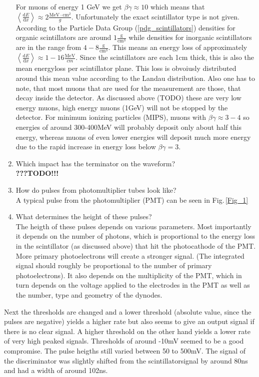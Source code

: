 \begin{enumerate}
For muons of energy 1 GeV we get $\beta\gamma\approx10$ which means that $\left\langle \frac{\mathrm{d}E}{\mathrm{d}x}\right\rangle \approx 2 \frac{\text{MeV}\cdot\text{cm}^2}{g}$. Unfortunately the exact scintillator type is not given. According to the Particle Data Group (\ref{pdg_scintillators}) densities for organic scintillators are around $1 \frac{\text{g}}{\text{cm}^3}	$ while densities for inorganic scintillators are in the range from $4-8 \frac{\text{g}}{\text{cm}^3}$. This means an energy loss of approximately $\left\langle \frac{\mathrm{d}E}{\mathrm{d}x}\right\rangle \approx 1-16 \frac{\text{MeV}}{cm}$. Since the scintillators are each 1cm thick, this is also the mean energyloss per scintillator plane. This loss is obvoiusly distributed around this mean value according to the Landau distribution. Also one has to note, that most muons that are used for the measurement are those, that decay inside the detector. As discussed above (TODO) these are very low energy muons, high energy muons (1GeV) will not be stopped by the detector. For minimum ionizing particles (MIPS), muons with $\beta\gamma\approx 3-4$ so energies of around 300-400MeV will probably deposit only about half this energy, whereas muons of even lower energies will deposit much more energy due to the rapid increase in energy loss below $\beta\gamma=3$.  
\item Which impact has the terminator on the waveform?\\
 \textbf{\LARGE{???TODO!!!}}
\item How do pulses from photomultiplier tubes look like?\\ 
A typical pulse from the photomultiplier (PMT) can be seen in Fig.\,\ref{Fig_1}
\item What determines the height of these pulses?\\
The heigth of these pulses depends on various parameters. Most importantly it depends on the number of photons, which is proportional to the energy loss in the scintillator (as discussed above) that hit the photocathode of the PMT. More primary photoelectrons will create a stronger signal. (The integrated signal should roughly be proportional to the number of primary photoelectrons). It also depends on the multiplicity of the PMT, which in turn depends on the voltage applied to the electrodes in the PMT as well as the number, type and geometry of the dynodes.
\end{enumerate}

Next the thresholds are changed and a lower threshold (absolute value, since the pulses are negative) yields a higher rate but also seems to give an output signal if there is no clear signal. A higher threshold on the other hand yields a lower rate of very high peaked signals. Thresholds of around -10mV seemed to be a good compromise. The pulse heigths still varied between 50 to 500mV. The signal of the discriminator was slightly shifted from the scintillatorsignal by around 80ns and had a width of around 102ns. 

